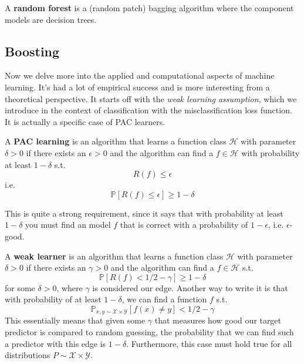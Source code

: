       \begin{definition}
        A \textbf{random forest} is a (random patch) bagging algorithm where the component models are decision trees.  
      \end{definition}

  \subsection{Boosting} 

        Now we delve more into the applied and computational aspects of machine learning. It's had a lot of empirical success and is more interesting from a theoretical perspective. It starts off with the \textit{weak learning assumption}, which we introduce in the context of classification with the misclassification loss function. It is actually a specific case of PAC learners. 

        \begin{definition}
          A \textbf{PAC learning} is an algorithm that learns a function class $\mathcal{H}$ with parameter $\delta > 0$ if there exists an $\epsilon > 0$ and the algorithm can find a $f \in \mathcal{H}$ with probability at least $1 - \delta$ s.t.
          \begin{equation}
            R(f) \leq \epsilon 
          \end{equation}
          i.e. 
          \begin{equation}
            \mathbb{P}[ R(f) \leq \epsilon] \geq 1 - \delta
          \end{equation}
        \end{definition}

        This is quite a strong requirement, since it says that with probability at least $1 - \delta$ you must find an model $f$ that is correct with a probability of $1 - \epsilon$, i.e. $\epsilon$-good.

        \begin{definition}
          A \textbf{weak learner} is an algorithm that learns a function class $\mathcal{H}$ with parameter $\delta > 0$ if there exists an $\gamma > 0$ and the algorithm can find a $f \in \mathcal{H}$ s.t. 
          \begin{equation}
            \mathbb{P}[ R(f) < 1/2 - \gamma] \geq 1 - \delta
          \end{equation}
          for some $\delta > 0$, where $\gamma$ is considered our edge. Another way to write it is that with probability of at least $1 - \delta$, we can find a function $f$ s.t. 
          \begin{equation}
            \mathbb{P}_{x, y \sim \mathcal{X} \times \mathcal{Y}} [f(x) \neq y] < 1/2 - \gamma 
          \end{equation}
          This essentially means that given some $\gamma$ that measures how good our target predictor is compared to random guessing, the probability that we can find such a predictor with this edge is $1 - \delta$. Furthermore, this case must hold true for all distributions $P \sim \mathcal{X} \times \mathcal{Y}$. 
        \end{definition}

